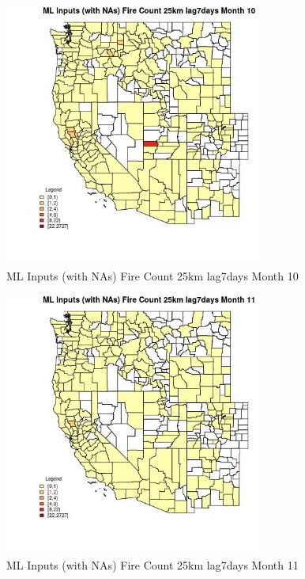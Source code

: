 \begin{figure} 
\centering  
\includegraphics[width=0.77\textwidth]{Code_Outputs/Report_ML_input_PM25_Step4_part_f_de_duplicated_aveswNAs_CountyFire_Count_25km_lag7daysmedianMonth10.jpg} 
\caption{\label{fig:Report_ML_input_PM25_Step4_part_f_de_duplicated_aveswNAsCountyFire_Count_25km_lag7daysmedianMonth10}ML Inputs (with NAs) Fire Count 25km lag7days Month 10} 
\end{figure} 
 

\begin{figure} 
\centering  
\includegraphics[width=0.77\textwidth]{Code_Outputs/Report_ML_input_PM25_Step4_part_f_de_duplicated_aveswNAs_CountyFire_Count_25km_lag7daysmedianMonth11.jpg} 
\caption{\label{fig:Report_ML_input_PM25_Step4_part_f_de_duplicated_aveswNAsCountyFire_Count_25km_lag7daysmedianMonth11}ML Inputs (with NAs) Fire Count 25km lag7days Month 11} 
\end{figure} 
 

